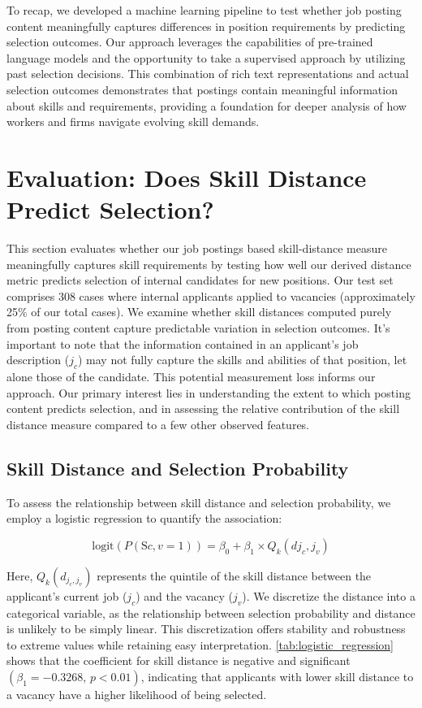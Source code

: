 \documentclass[12pt]{article}
\begin{document}
To recap, we developed a machine learning pipeline to test whether job posting content meaningfully captures differences in position requirements by predicting selection outcomes. Our approach leverages the capabilities of pre-trained language models and the opportunity to take a supervised approach by utilizing past selection decisions. This combination of rich text representations and actual selection outcomes demonstrates that postings contain meaningful information about skills and requirements, providing a foundation for deeper analysis of how workers and firms navigate evolving skill demands.


\section{Evaluation: Does Skill Distance Predict Selection?}\label{sec:evaluation_skill_distance}

This section evaluates whether our job postings based skill-distance measure meaningfully captures skill requirements by testing how well our derived distance metric predicts selection of internal candidates for new positions. Our test set comprises 308 cases where internal applicants applied to vacancies (approximately 25\% of our total cases). We examine whether skill distances computed purely from posting content capture predictable variation in selection outcomes. It's important to note that the information contained in an applicant's job description ($j_c$) may not fully capture the skills and abilities of that position, let alone those of the candidate. This potential measurement loss informs our approach. Our primary interest lies in understanding the extent to which posting content predicts selection, and in assessing the relative contribution of the skill distance measure compared to a few other observed features.

\subsection{Skill Distance and Selection Probability}

To assess the relationship between skill distance and selection probability, we employ a logistic regression to quantify the association:

\begin{equation}
\text{logit}(P(\text{S}{c,v} = 1)) = \beta_0 + \beta_1 \times Q_k(d{j_c, j_v})
\end{equation} 

Here, \( Q_k(d_{j_c, j_v}) \) represents the quintile of the skill distance between the applicant's current job (\( j_c \)) and the vacancy (\( j_v \)). We discretize the distance into a categorical variable, as the relationship between selection probability and distance is unlikely to be simply linear. This discretization offers stability and robustness to extreme values while retaining easy interpretation. \autoref{tab:logistic_regression} shows that the coefficient for skill distance is negative and significant \((\beta_1 = -0.3268, \, p < 0.01)\), indicating that applicants with lower skill distance to a vacancy have a higher likelihood of being selected.
\end{document}
